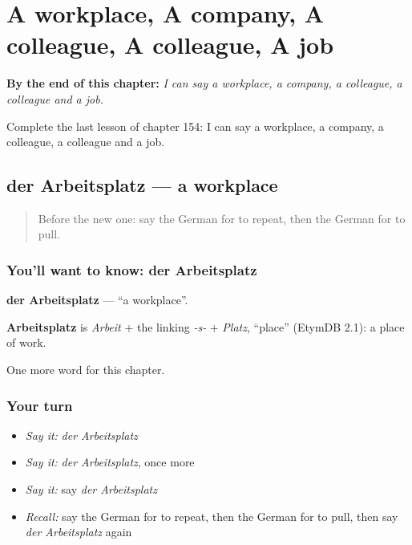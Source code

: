 
\chapter{A workplace, A company, A colleague, A colleague, A job}
\label{ch:ge-a-workplace-a-company-a-colleague-a-colleague-a-job}

\begin{chapteropening}
\textbf{By the end of this chapter:} \emph{I can say a workplace, a company, a colleague, a colleague and a job.}

Complete the last lesson of chapter 154: I can say a workplace, a company, a colleague, a colleague and a job.
\end{chapteropening}

\section[der Arbeitsplatz]{der Arbeitsplatz — a workplace}

\label{lesson:GE-C154-arbeitsplatz}



\begin{quote}
Before the new one: say the German for to repeat, then the German for to pull.
\end{quote}

\subsection*{You'll want to know: der Arbeitsplatz}
\textbf{der Arbeitsplatz} — \textquotedblleft{}a workplace\textquotedblright{}.

\begin{cousinweb}
\textbf{Arbeitsplatz} is \emph{Arbeit} + the linking \emph{-s-} + \emph{Platz}, \textquotedblleft{}place\textquotedblright{} (EtymDB 2.1): a place of work.
\end{cousinweb}

\begin{grammarlens}[title={What you've built}]
One more word for this chapter.
\end{grammarlens}

\subsection*{Your turn}
\begin{itemize}
\raggedright
  \item \emph{Say it:} \emph{der Arbeitsplatz}
  \item \emph{Say it:} \emph{der Arbeitsplatz}, once more
  \item \emph{Say it:} say \emph{der Arbeitsplatz}
  \item \emph{Recall:} say the German for to repeat, then the German for to pull, then say \emph{der Arbeitsplatz} again
\end{itemize}

